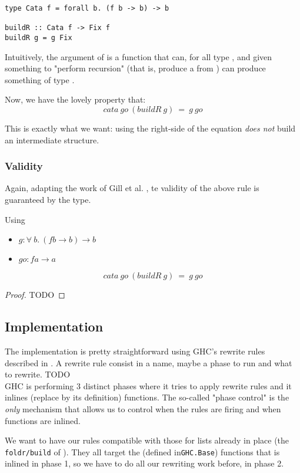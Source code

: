 \begin{verbatim}
type Cata f = forall b. (f b -> b) -> b

buildR :: Cata f -> Fix f
buildR g = g Fix
\end{verbatim}

Intuitively, the argument of  is a function that can, for all type , and given something to "perform recursion" (that is, produce a  from ) can produce something of type .

Now, we have the lovely property that:
$$cata\ go\ (buildR\ g)\ =\ g\ go$$

This is exactly what we want: using the right-side of the equation \emph{does not}
build an intermediate structure.

\subsubsection{Validity}
Again, adapting the work of Gill et al. \cite{Gill:1993:SCD:165180.165214}, te validity of the above rule is guaranteed by the type.

\begin{theorem}
Using
\begin{itemize}
	\item $g : \forall\ b.\ (f b \to b) \to b$
	\item $go : f a \to a $
\end{itemize}
$$cata\ go\ (buildR\ g)\ =\ g\ go$$
\end{theorem}
\begin{proof}
	TODO
\end{proof}

\subsection{Implementation}
The implementation is pretty straightforward using GHC's rewrite rules described in \cite{pbr}. A rewrite rule consist in a name, maybe a phase to run and what to rewrite. TODO\\
GHC is performing 3 distinct phases where it tries to apply rewrite rules and it inlines (replace by its definition) functions. The so-called "phase control" is the \emph{only} mechanism that allows us to control when the rules are firing and when functions are inlined.

We want to have our rules compatible with those for lists already in place (the \verb|foldr/build| of \cite{Gill:1993:SCD:165180.165214}). They all target the  (defined in\verb|GHC.Base|) functions that is inlined in phase 1, so we have to do all our rewriting work before, in phase 2.

